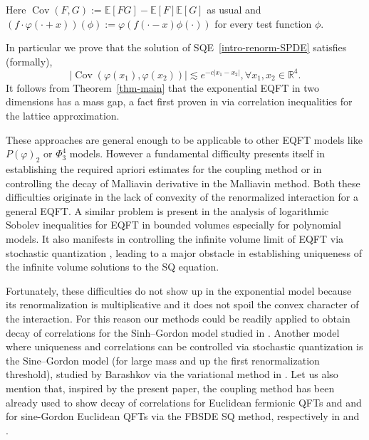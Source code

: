 \documentclass{article}
\newcommand{\assign}{:=}
\newcommand{\tmop}[1]{\ensuremath{\operatorname{#1}}}
\begin{document}
\begin{remark}
  Here $\tmop{Cov} (F, G) \assign \mathbb{E} [F G] -\mathbb{E} [F] \mathbb{E}[G]$ as usual and $(f \cdot \varphi (\cdot + x)) (\phi)  := \varphi (f (\cdot - x) \phi (\cdot))$ for every test function $\phi$.
\end{remark}
%
In particular we prove that the solution of SQE~\eqref{intro-renorm-SPDE}
satisfies (formally),
\begin{equation}
  | \tmop{Cov} (\varphi (x_1), \varphi (x_2)) | \lesssim e^{- c | x_1 - x_2
  |}, \forall x_1, x_2 \in \mathbb{R}^4 . \label{intro-corr-est}
\end{equation}
It follows from Theorem~\ref{thm-main} that the exponential EQFT in two dimensions has a mass gap, a fact first proven in {\cite{AHK74}} via correlation inequalities for the lattice approximation.


These approaches are general enough to be applicable to other EQFT models
like $P(\varphi)_2$ or $\Phi^4_3$ models. However a fundamental difficulty
presents itself in establishing the required apriori estimates for the
coupling method or in controlling the decay of Malliavin derivative in the
Malliavin method. Both these difficulties originate in the lack of convexity
of the renormalized interaction for a general EQFT. A similar problem is
present in the analysis of logarithmic Sobolev inequalities for EQFT in
bounded volumes {\cite{bauerschmidtLogSobolevInequality2021,bauerschmidtLogSobolevInequalityVarphi2022}} especially for polynomial models. It also manifests in controlling the infinite volume limit of EQFT via stochastic
quantization {\cite{GH2019,gubinelliPDEConstructionEuclidean2021,barashkovVariationalMethodEuclidean2021,gubinelliStochasticQuantisationFractional2023}}, leading to a major obstacle in establishing uniqueness of the infinite volume solutions to the SQ equation.



Fortunately, these difficulties do not show up in the exponential model
because its renormalization is multiplicative and it does not spoil the convex
character of the interaction. For this reason our methods could be readily
applied to obtain decay of correlations for the Sinh--Gordon model studied
in {\cite{BV2021arXiv}}. Another model where uniqueness and correlations can
be controlled via stochastic quantization is the Sine--Gordon model (for large
mass and up the first renormalization threshold), studied by Barashkov via the
variational method in {\cite{barashkovStochasticControlApproach2022}}. Let us also mention that, inspired by the present paper, the coupling method has been already used to show decay of correlations for Euclidean fermionic QFTs and and for sine-Gordon Euclidean QFTs via the FBSDE SQ method, respectively in {\cite{devecchiStochasticAnalysisSubcritical2022}} and {\cite{GubinelliMeyer2024}}. 
\end{document}
